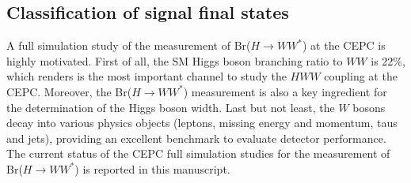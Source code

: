 \documentclass[11pt,a4paper]{cepcnote}
\begin{document}
\subsection{Classification of signal final states}
A full simulation study of the measurement of Br($H\rightarrow WW^*$) at the CEPC is highly motivated. First of all, 
the SM Higgs boson branching ratio to $WW$ is 22\%, which renders is the most important channel 
to study the $HWW$ coupling at the CEPC. Moreover, the Br($H\rightarrow WW^*$) measurement is also 
a key ingredient for the determination of the Higgs boson width. Last but not least, the $W$ bosons decay into various physics 
objects (leptons, missing energy and momentum, taus and jets), providing an excellent benchmark to evaluate detector 
performance. The current status of the CEPC full simulation studies for the measurement of Br($H\rightarrow WW^*$)
is reported in this manuscript. 
\end{document}
